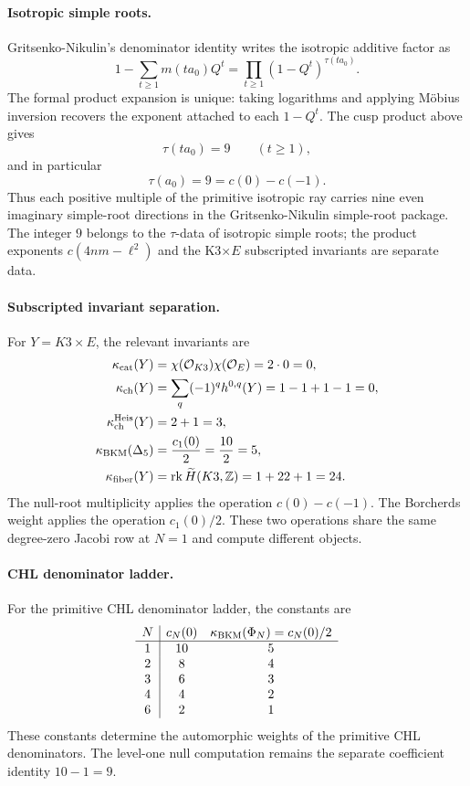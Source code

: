 \paragraph{Isotropic simple roots.}
Gritsenko-Nikulin's denominator identity writes the isotropic additive
factor as
\[
 1-\sum_{t\geq1}m(ta_0)Q^t
 =\prod_{t\geq1}(1-Q^t)^{\tau(ta_0)} .
\]
The formal product expansion is unique: taking logarithms and applying
M\"obius inversion recovers the exponent attached to each \(1-Q^t\).  The
cusp product above gives
\[
 \tau(ta_0)=9\qquad(t\geq1),
\]
and in particular
\[
 \boxed{\tau(a_0)=9=c(0)-c(-1).}
\]
Thus each positive multiple of the primitive isotropic ray carries nine
even imaginary simple-root directions in the Gritsenko-Nikulin simple-root
package.  The integer \(9\) belongs to the \(\tau\)-data of isotropic
simple roots; the product exponents \(c(4nm-\ell^2)\) and the K3\(\times E\)
subscripted invariants are separate data.

\paragraph{Subscripted invariant separation.}
For \(Y=K3\times E\), the relevant invariants are
\[
\begin{aligned}
 \kappa_{\mathrm{cat}}(Y)
 &=\chi(\mathcal O_{K3})\chi(\mathcal O_E)
   =2\cdot0=0,\\
 \kappa_{\mathrm{ch}}(Y)
 &=\sum_q(-1)^qh^{0,q}(Y)
   =1-1+1-1=0,\\
 \kappa_{\mathrm{ch}}^{\mathrm{Heis}}(Y)
 &=2+1=3,\\
 \kappa_{\mathrm{BKM}}(\Delta_5)
 &=\frac{c_1(0)}2=\frac{10}{2}=5,\\
 \kappa_{\mathrm{fiber}}(Y)
 &=\operatorname{rk}\widetilde H(K3,\mathbb Z)=1+22+1=24 .
\end{aligned}
\]
The null-root multiplicity applies the operation \(c(0)-c(-1)\).  The
Borcherds weight applies the operation \(c_1(0)/2\).  These two operations
share the same degree-zero Jacobi row at \(N=1\) and compute different
objects.

\paragraph{CHL denominator ladder.}
For the primitive CHL denominator ladder, the constants are
\[
\begin{array}{c|cc}
N & c_N(0) & \kappa_{\mathrm{BKM}}(\Phi_N)=c_N(0)/2 \\ \hline
1 & 10 & 5\\
2 & 8 & 4\\
3 & 6 & 3\\
4 & 4 & 2\\
6 & 2 & 1
\end{array}
\]
These constants determine the automorphic weights of the primitive CHL
denominators.  The level-one null computation remains the separate
coefficient identity \(10-1=9\).

